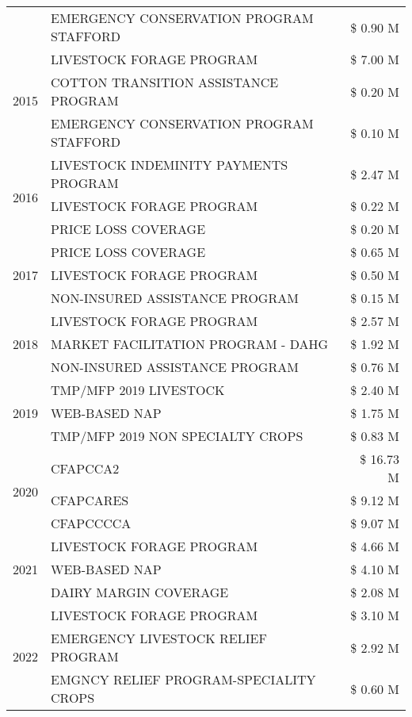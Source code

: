 \begin{tabular}{llr}
 & EMERGENCY CONSERVATION PROGRAM STAFFORD & \$ 0.90 M \\
\cline{1-3}
\multirow[t]{3}{*}{2015} & LIVESTOCK FORAGE PROGRAM & \$ 7.00 M \\
 & COTTON TRANSITION ASSISTANCE PROGRAM & \$ 0.20 M \\
 & EMERGENCY CONSERVATION PROGRAM STAFFORD & \$ 0.10 M \\
\cline{1-3}
\multirow[t]{3}{*}{2016} & LIVESTOCK INDEMINITY PAYMENTS PROGRAM & \$ 2.47 M \\
 & LIVESTOCK FORAGE PROGRAM & \$ 0.22 M \\
 & PRICE LOSS COVERAGE & \$ 0.20 M \\
\cline{1-3}
\multirow[t]{3}{*}{2017} & PRICE LOSS COVERAGE & \$ 0.65 M \\
 & LIVESTOCK FORAGE PROGRAM & \$ 0.50 M \\
 & NON-INSURED ASSISTANCE PROGRAM & \$ 0.15 M \\
\cline{1-3}
\multirow[t]{3}{*}{2018} & LIVESTOCK FORAGE PROGRAM & \$ 2.57 M \\
 & MARKET FACILITATION PROGRAM - DAHG & \$ 1.92 M \\
 & NON-INSURED ASSISTANCE PROGRAM & \$ 0.76 M \\
\cline{1-3}
\multirow[t]{3}{*}{2019} & TMP/MFP 2019 LIVESTOCK & \$ 2.40 M \\
 & WEB-BASED NAP & \$ 1.75 M \\
 & TMP/MFP 2019 NON SPECIALTY CROPS & \$ 0.83 M \\
\cline{1-3}
\multirow[t]{3}{*}{2020} & CFAPCCA2 & \$ 16.73 M \\
 & CFAPCARES & \$ 9.12 M \\
 & CFAPCCCCA & \$ 9.07 M \\
\cline{1-3}
\multirow[t]{3}{*}{2021} & LIVESTOCK FORAGE PROGRAM & \$ 4.66 M \\
 & WEB-BASED NAP & \$ 4.10 M \\
 & DAIRY MARGIN COVERAGE & \$ 2.08 M \\
\cline{1-3}
\multirow[t]{3}{*}{2022} & LIVESTOCK FORAGE PROGRAM & \$ 3.10 M \\
 & EMERGENCY LIVESTOCK RELIEF PROGRAM & \$ 2.92 M \\
 & EMGNCY RELIEF PROGRAM-SPECIALITY CROPS & \$ 0.60 M \\
\cline{1-3}
\bottomrule
\end{tabular}
